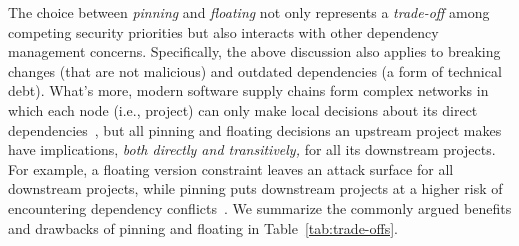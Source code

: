 The choice between \emph{pinning} and \emph{floating} not only represents a \emph{trade-off} among competing security priorities but also interacts with other dependency management concerns.
Specifically, the above discussion also applies to breaking changes (that are not malicious) and outdated dependencies (a form of technical debt).
What's more, modern software supply chains form complex networks in which each node (i.e., project) can only make local decisions about its direct dependencies~\cite{DBLP:journals/ese/DecanMG19}, but all pinning and floating decisions an upstream project makes have implications, \textit{both directly and transitively,} for all its downstream projects.
For example, a floating version constraint leaves an attack surface for all downstream projects, while pinning puts downstream projects at a higher risk of encountering dependency conflicts~\cite{DBLP:conf/sigsoft/WangWLWWYYZC18, DBLP:conf/icse/PinckneyCGBCG23}.
We summarize the commonly argued benefits and drawbacks of pinning and floating in Table~\ref{tab:trade-offs}.

